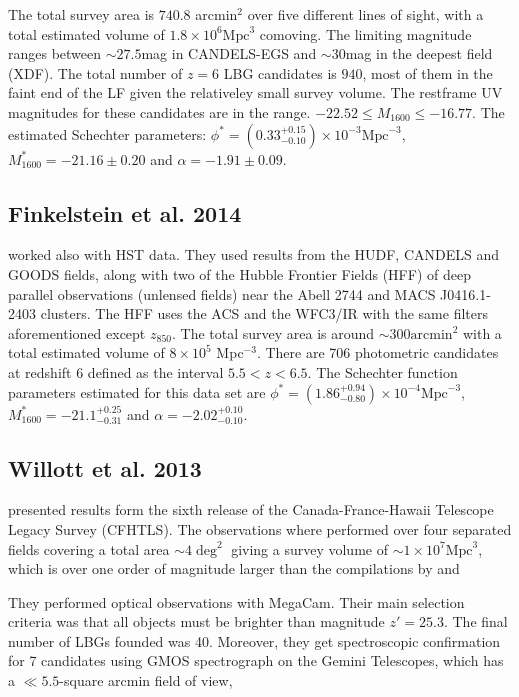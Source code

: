 \documentclass{emulateapj}
\begin{document}
The total survey area is $740.8$ arcmin$^2$ over five different lines
of sight, with a total estimated volume of  $1.8 \times 10^6
\textrm{Mpc}^3$ comoving. 
The limiting magnitude ranges between $\sim27.5$mag in CANDELS-EGS and
$\sim30 $mag in  the  deepest field (XDF). 
The total number of $z=6$ LBG candidates is $940$, most of 
them in the faint end of the LF given the relativeley small survey volume.
The restframe UV magnitudes for these candidates are in the range.
$-22.52\leq M_{1600} \leq -16.77$.
The estimated Schechter parameters:
$\phi^* =(0.33_{-0.10}^{+0.15}) \times 10 ^{-3}  \textrm{Mpc}^{-3} $, 
$M^*_{1600} = -21.16\pm 0.20$ and $\alpha = -1.91 \pm 0.09$. 


\subsection{Finkelstein et al. 2014}
\citet{Finkelstein14} worked also with HST data.
They used results from the HUDF, CANDELS and GOODS  fields, along with
two of the Hubble Frontier Fields (HFF) of deep parallel  observations
(unlensed fields) near the Abell 2744 and MACS J0416.1-2403  clusters. 
The HFF uses the ACS and the WFC3/IR with the same filters
aforementioned except $z_{850}$. 
The total survey area is around   $\sim300\textrm{arcmin}^2$ with a
total estimated volume of $8\times 10^5$ Mpc$^{-3}$.
There are 706 photometric candidates at redshift 6  defined as the
interval $5.5<z<6.5$. 
The Schechter function parameters estimated for this data set 
are $\phi^* =(1.86_{-0.80}^{+0.94}) \times 10 ^{-4}  \textrm{Mpc}^{-3} $, 
$M^*_{1600} = -21.1_{-0.31}^{+0.25}$ and $\alpha = -2.02_{-0.10}^{+0.10}$. 
 
\subsection{Willott et al. 2013}
\citet{Willott13} presented results form the sixth release of the Canada-France-Hawaii 
Telescope Legacy Survey (CFHTLS). 
The observations where performed over four separated fields covering a
total area $\sim 4 \deg^2$ giving a survey volume of $\sim 1 \times
10^7 \textrm{Mpc}^3$, which is over one order of magnitude larger than
the compilations by \citet{Bouwens15} and \citet{Finkelstein14} 

They performed optical observations with MegaCam.
Their main selection criteria was that all objects must be brighter
than magnitude $z' = 25.3$. 
The final  number of LBGs founded was 40. 
Moreover, they get spectroscopic confirmation 
for 7 candidates using GMOS spectrograph on the Gemini Telescopes, which 
has a $\ll 5.5$-square arcmin field of view, 
\end{document}
